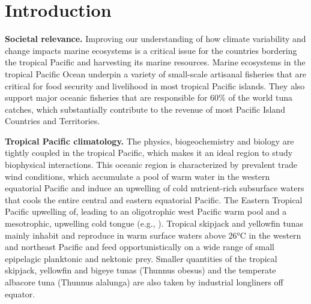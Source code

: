 \section{Introduction}

\textbf{Societal relevance.} Improving our understanding of how climate variability and change impacts marine ecosystems is a critical issue for the countries bordering the tropical Pacific and harvesting its marine resources. Marine ecosystems in the tropical Pacific Ocean underpin a variety of small-scale artisanal fisheries that are critical for food security and livelihood in most tropical Pacific islands. They also support major oceanic fisheries that are responsible for 60\% of the world tuna catches, which substantially contribute to the revenue of most Pacific Island Countries and Territories. 

\textbf{Tropical Pacific climatology.} The physics, biogeochemistry and biology are tightly coupled in the tropical Pacific, which makes it an ideal region to study biophysical interactions. This oceanic region is characterized by prevalent trade wind conditions, which accumulate a pool of warm water in the western equatorial Pacific and induce an upwelling of cold nutrient-rich subsurface waters that cools the entire central and eastern equatorial Pacific. The Eastern Tropical Pacific upwelling of, leading to an oligotrophic west Pacific warm pool and a mesotrophic, upwelling cold tongue (e.g., \cite{leborgneCarbonFluxesEquatorial2002}). Tropical skipjack and yellowfin tunas mainly inhabit and reproduce in warm surface waters above 26°C in the western and northeast Pacific and feed opportunistically on a wide range of small epipelagic planktonic and nektonic prey. Smaller quantities of the tropical skipjack, yellowfin and bigeye tunas (Thunnus obesus) and the temperate albacore tuna (Thunnus alalunga) are also taken by industrial longliners off equator.

